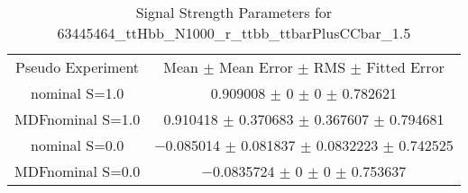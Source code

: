 \begin{table}
\centering
\caption{Signal Strength Parameters for 63445464\_ttHbb\_N1000\_r\_ttbb\_ttbarPlusCCbar\_1.5}
\begin{tabular}{cc}
\toprule
Pseudo Experiment & Mean $\pm$ Mean Error $\pm$ RMS $\pm$ Fitted Error\\
nominal S=1.0 & \num{0.909008} $\pm$ \num{0} $\pm$ \num{0} $\pm$ \num{0.782621}\\
MDFnominal S=1.0 & \num{0.910418} $\pm$ \num{0.370683} $\pm$ \num{0.367607} $\pm$ \num{0.794681}\\
nominal S=0.0 & \num{-0.085014} $\pm$ \num{0.081837} $\pm$ \num{0.0832223} $\pm$ \num{0.742525}\\
MDFnominal S=0.0 & \num{-0.0835724} $\pm$ \num{0} $\pm$ \num{0} $\pm$ \num{0.753637}\\
\bottomrule
\end{tabular}
\end{table}